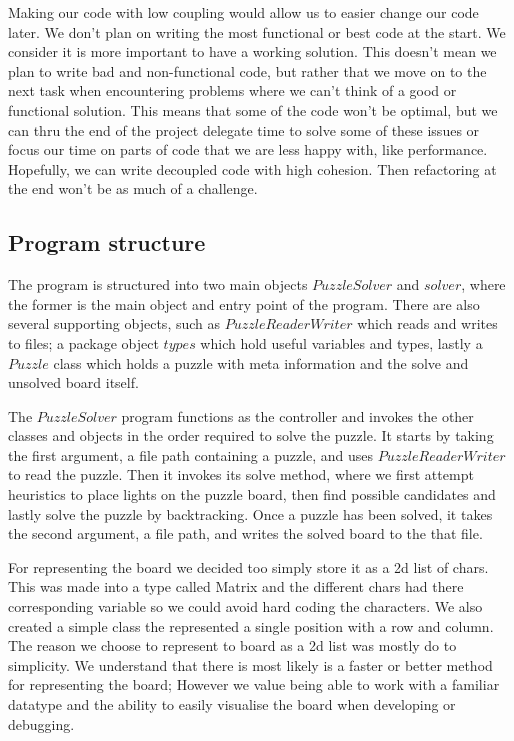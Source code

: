 \documentclass[12pt]{article}
\begin{document}
Making our code with low coupling would allow us to easier change our code later. We don't plan on writing the most functional or best code at the start. We consider it is more important to have a working solution. This doesn't mean we plan to write bad and non-functional code, but rather that we move on to the next task when encountering problems where we can't think of a good or functional solution. This means that some of the code won't be optimal, but we can thru the end of the project delegate time to solve some of these issues or focus our time on parts of code that we are less happy with, like performance. Hopefully, we can write decoupled code with high cohesion. Then refactoring at the end won't be as much of a challenge.


\subsection{Program structure}

The program is structured into two main objects $PuzzleSolver$ and $solver$, where the former is the main object and entry point of the program. There are also several supporting objects, such as $PuzzleReaderWriter$ which reads and writes to files; a package object $types$ which hold useful variables and types, lastly a $Puzzle$ class which holds a puzzle with meta information and the solve and unsolved board itself.

The $PuzzleSolver$ program functions as the controller and invokes the other classes and objects in the order required to solve the puzzle. It starts by taking the first argument, a file path containing a puzzle, and uses $PuzzleReaderWriter$ to read the puzzle. Then it invokes its solve method, where we first attempt heuristics to place lights on the puzzle board, then find possible candidates and lastly solve the puzzle by backtracking. Once a puzzle has been solved, it takes the second argument, a file path, and writes the solved board to the that file.

For representing the board we decided too simply store it as a 2d list of chars. This was made into a type called Matrix and the different chars had there corresponding variable so we could avoid hard coding the characters. We also created a simple class the represented a single position with a row and column. The reason we choose to represent to board as a 2d list was mostly do to simplicity. We understand that there is most likely is a faster or better method for representing the board; However we value being able to work with a familiar datatype and the ability to easily visualise the board when developing or debugging.
\end{document}
